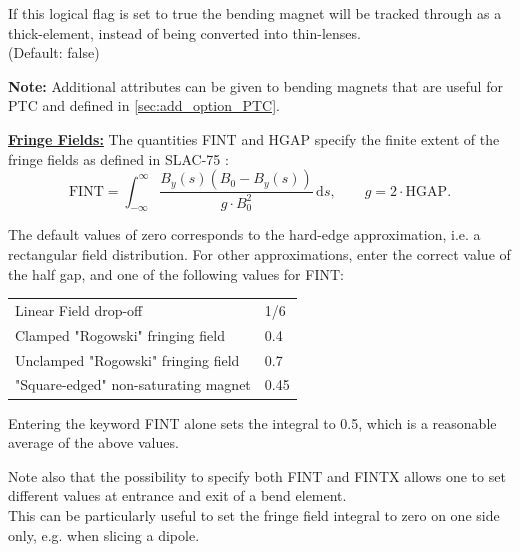 \begin{madlist}

    If this logical flag is set to true the bending 
   magnet will be tracked through as a thick-element, instead of being
   converted into thin-lenses. \\
   (Default: false)
\end{madlist}

{\bf Note:} Additional attributes can be given to bending magnets that
are useful for PTC and defined in \ref{sec:add_option_PTC}.

\vskip 5mm
{\bf \underline{Fringe Fields:}}
\vskip 3mm
The quantities FINT and HGAP specify the finite extent of the fringe
fields as defined in SLAC-75 \cite{slac75}:
\begin{equation}
\mathrm{FINT}=\int_{-\infty}^\infty \frac{B_y(s)(B_0-B_y(s))}{g \cdot
  B_0^2}\,\mathrm{d}s ,\quad\quad g=2\cdot \mathrm{HGAP}. 
\end{equation}

The default values of zero corresponds to the hard-edge approximation,
i.e. a rectangular field distribution. For other approximations, enter
the correct value of the half gap, and one of the following values for
FINT: 
 
\begin{center}
  \begin{tabular}{l l}
    Linear Field drop-off                   &  1/6 \\
    Clamped "Rogowski" fringing field       &  0.4 \\
    Unclamped "Rogowski" fringing field     &  0.7 \\
    "Square-edged" non-saturating magnet    &  0.45
  \end{tabular}
\end{center}


Entering the keyword FINT alone sets the integral to 0.5, which is a
reasonable average of the above values.  

Note also that the possibility to specify both FINT and FINTX  allows
one to set different values at entrance and exit of a bend element. \\ 
This can be particularly useful to set the fringe field integral to zero
on one side only, e.g. when slicing a dipole.  


